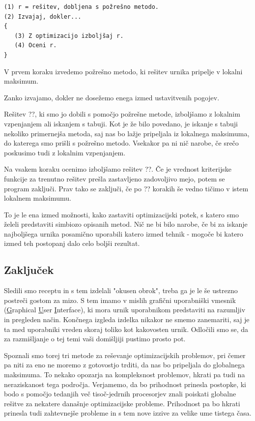 \documentclass[10pt,a4paper]{article}
\begin{document}
\begin{verbatim}
(1) r = rešitev, dobljena s požrešno metodo.
(2) Izvajaj, dokler...
{
   (3) Z optimizacijo izboljšaj r.
   (4) Oceni r.
}
\end{verbatim}

   V prvem koraku izvedemo požrešno metodo, ki rešitev urnika pripelje v lokalni maksimum.

   Zanko izvajamo, dokler ne dosežemo enega izmed ustavitvenih pogojev.

   Rešitev ??, ki smo jo dobili s pomočjo požrešne metode, izboljšamo z lokalnim vzpenjanjem
   ali iskanjem s tabuji. Kot je že bilo povedano, je iskanje s tabuji nekoliko primernejša metoda,
   saj nas bo lažje pripeljala iz lokalnega maksimuma, do katerega smo prišli s požrešno metodo.
   Vsekakor pa ni nič narobe, če srečo poskusimo tudi z lokalnim vzpenjanjem.

   Na vsakem koraku ocenimo izboljšamo rešitev ??. Če je vrednost kriterijske funkcije
   za trenutno rešitev prešla zastavljeno zadovoljivo mejo, potem se program zaključi. Prav tako
   se zaključi, če po ?? korakih še vedno tičimo v istem lokalnem maksimumu.

\noindent
To je le ena izmed možnosti, kako zastaviti optimizacijski potek, s katero smo želeli predstaviti
simbiozo opisanih metod. Nič ne bi bilo narobe, če bi za iskanje najboljšega urnika posamično
uporabili katero izmed tehnik - mogoče bi katero izmed teh postopanj dalo celo boljši rezultat.

\subsection{Zaključek}

Sledili smo receptu in s tem izdelali "okusen obrok", treba ga je le še ustrezno postreči
gostom za mizo. S tem imamo v mislih grafični uporabniški vmesnik (\underline{G}raphical
\underline{U}ser \underline{I}nterface), ki mora urnik uporabnikom predstaviti na razumljiv in
pregleden način. Končnega izgleda izdelka nikakor ne smemo zanemariti, saj je ta med uporabniki
vreden skoraj toliko kot kakovosten urnik. Odločili smo se, da za razmišljanje o tej temi vaši
domišljiji pustimo prosto pot.

Spoznali smo torej tri metode za reševanje optimizacijskih problemov, pri čemer pa niti za eno
ne moremo z gotovostjo trditi, da nas bo pripeljala do globalnega maksimuma. To nekako opozarja
na kompleksnost problemov, hkrati pa tudi na neraziskanost tega področja. Verjamemo, da bo
prihodnost prinesla postopke, ki bodo s pomočjo tedanjih več tisoč-jedrnih procesorjev znali
poiskati globalne rešitve za nekatere današnje optimizacijske probleme. Prihodnost pa bo
hkrati prinesla tudi zahtevnejše probleme in s tem nove izzive za velike ume tistega časa.
\end{document}
